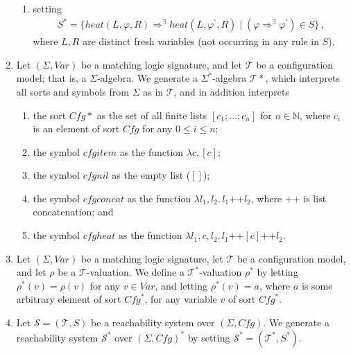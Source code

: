 \documentclass{article}
\begin{document}
\begin{definition}
\begin{enumerate}
\begin{enumerate}
              \item setting
              \begin{align*}
              S^* = \{ \mathit{heat}(L, \varphi, R) \Rightarrow^\exists \mathit{heat}(L, \varphi^\prime, R)
              \mid  ( \varphi \Rightarrow^\exists \varphi^\prime ) \in S \} \, ,
            \end{align*}
                          where $L,R$ are distinct fresh variables (not occurring in any rule in $S$).
          \end{enumerate}
    \item Let $(\Sigma, \mathit{Var})$ be a matching logic signature, and let $\mathcal{T}$ be a configuration model; that is, a $\Sigma$-algebra.
          We generate a $\Sigma^*$-algebra $\mathcal{T}*$, which interprets all sorts and symbols from
          $\Sigma$ as in $\mathcal{T}$, and in addition interprets
          \begin{enumerate}
              \item the sort $\mathit{Cfg}*$ as the set of all finite lists
              $[c_1;\ldots;c_n]$ for $n \in \mathbb{N}$, where $c_i$ is an element of sort $\mathit{Cfg}$
              for any $0 \leq i \leq n$;
              \item the symbol $\mathit{cfgitem}$ as the function $\lambda c.\, [c]$;
              \item the symbol $\mathit{cfgnil}$ as the empty list ($[]$);
              \item the symbol $\mathit{cfgconcat}$ as the function $\lambda l_1,l_2.\, l_1 \texttt{++} l_2$,
                where $\texttt{++}$ is list concatenation; and
              \item the symbol $\mathit{cfgheat}$ as the function
                $\lambda l_1, c, l_2.\, l_1 \texttt{++} [c] \texttt{++} l_2$.
          \end{enumerate}

    \item Let $(\Sigma, \mathit{Var})$ be a matching logic signature, let $\mathcal{T}$ be a configuration model,
        and let $\rho$ be a $\mathcal{T}$-valuation.
        We define a $\mathcal{T}^*$-valuation $\rho^*$ by letting $\rho^*(v) = \rho(v)$ for any $v \in \mathit{Var}$,
        and letting $\rho^*(v) = a$, where $a$ is some arbitrary element of sort $\mathit{Cfg}^*$, for
        any variable $v$ of sort $\mathit{Cfg}^*$.
          
    \item Let $\mathcal{S} = (\mathcal{T}, S)$ be a reachability system over $(\Sigma, \mathit{Cfg})$.
          We generate a reachability system $\mathcal{S}^*$ over $(\Sigma, \mathit{Cfg})^*$
          by setting $\mathcal{S}^* = (\mathcal{T}^*, S^*)$.
\end{enumerate}
\end{definition}
\end{document}
